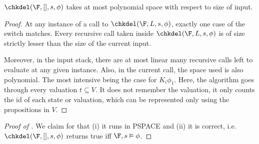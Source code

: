 \begin{theorem}
    $\chkdel(\F,[],s,\phi)$ takes at most polynomial space with respect to size of input.
\end{theorem}
\begin{proof}
    At any instance of a call to $\chkdel(\F,L,s,\phi)$, exactly one case of the switch matches. Every recursive call taken inside $\chkdel(\F,L,s,\phi)$ is of size strictly lesser than the size of the current input. 

    Moreover, in the input stack, there are at most linear many recursive calls left to evaluate at any given instance. Also, in the current call, the space used is also polynomial. The most intensive being the case for $K_i \phi_1$. Here, the algorithm goes through every valuation $t\subseteq V$. It does not remember the valuation, it only counts the id of each state or valuation, which can be represented only using the propositions in $V$. 
\end{proof}


\begin{proof}[Proof of ]
We claim for  that
(i) it runs in PSPACE and
(ii) it is correct, i.e.\ $\chkdel(\F, [], s, \phi)$ returns true iff $\F, s \vDash \phi$.

\end{proof}
